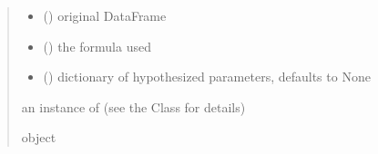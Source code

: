 \documentclass[letterpaper,10pt,english]{sphinxmanual}
\begin{document}
\begin{fulllineitems}
\begin{quote}
\begin{description}
\begin{itemize}
\item {} 
\sphinxAtStartPar
{} () \textendash{} original DataFrame

\item {} 
\sphinxAtStartPar
{} () \textendash{} the formula used

\item {} 
\sphinxAtStartPar
{} (\sphinxstyleliteralemphasis{\sphinxupquote{, }}) \textendash{} dictionary of hypothesized parameters, defaults to None

\end{itemize}

\sphinxAtStartPar
an instance of  (see the Class for details)

\sphinxAtStartPar
object

\end{description}\end{quote}

\end{fulllineitems}

\end{document}

